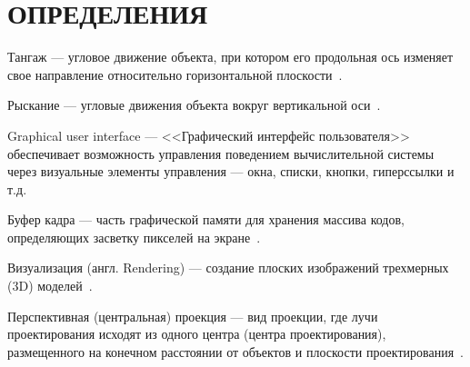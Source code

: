 \section*{\centering ОПРЕДЕЛЕНИЯ}

Тангаж --- угловое движение объекта, при котором его продольная ось изменяет свое направление относительно горизонтальной плоскости~\cite{palcing-camera}.

Рыскание --- угловые движения объекта вокруг вертикальной оси~\cite{palcing-camera}.

Graphical user interface --- <<Графический интерфейс пользователя>> обеспечивает возможность управления поведением вычислительной системы через визуальные элементы управления — окна, списки, кнопки, гиперссылки и т.д.~\cite{termin-cg}

Буфер кадра --- часть графической памяти для хранения массива кодов, определяющих засветку пикселей на экране~\cite{termin-cg}.

Визуализация (англ. Rendering) --- создание плоских изображений трехмерных (3D) моделей~\cite{termin-cg}.

Перспективная (центральная) проекция --- вид проекции, где лучи проектирования исходят из одного центра (центра проектирования), размещенного на конечном расстоянии от объектов и плоскости проектирования~\cite{termin-cg}.
